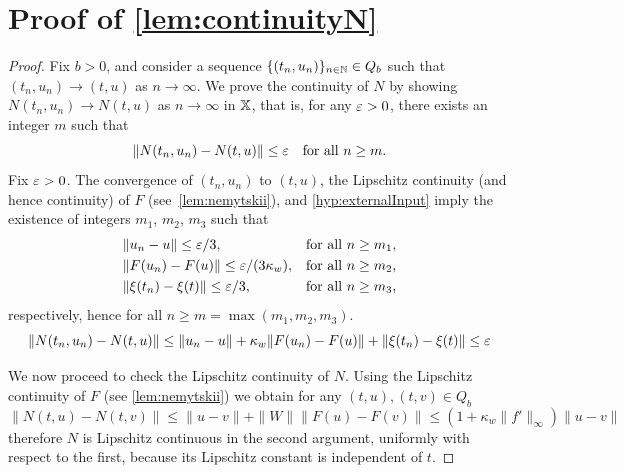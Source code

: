 \documentclass[a4paper,baskervaldx]{daarticle}
\begin{document}
\section{Proof of \texorpdfstring{\cref{lem:continuityN}}{Lemma Continuity of N}}\label{app:proof:lem:continuityN}
\begin{proof}
  Fix $b>0$, and consider a sequence $\{ (t_n,u_n)
  \}_{n \in \mathbb{N}} \in Q_b$ such that $(t_n,u_n) \to (t,u)$ as $n \to \infty$. We
  prove the continuity of $N$ by showing $N(t_n,u_n) \to N(t,u)$ as
  $n \to \infty$ in $\mathbb{X}$, that is, for any $\varepsilon >0$, there exists an
  integer $m$ such that
  \[
    \| N(t_n,u_n) - N(t,u) \| \leq \varepsilon \quad \text{for all $n \geq m$.} 
  \]
  Fix $\varepsilon >0 $. The convergence of $(t_n,u_n)$ to $(t,u)$, the Lipschitz
  continuity (and hence continuity) of $F$ (see~\cref{lem:nemytskii}), and
  \cref{hyp:externalInput} imply the existence of
  integers $m_1$, $m_2$, $m_3$ such that
  \[
    \begin{aligned}
    & \| u_n - u \| \leq \eps / 3,%
    &&\text{for all $n \geq m_1$,}\\
    & \| F(u_n) - F(u) \| \leq \eps / (3 \kappa_w), %
    &&\text{for all $n \geq m_2$,}\\
    & \| \xi(t_n) - \xi(t) \| \leq \eps / 3,%
    &&\text{for all $n \geq m_3$,}
    \end{aligned}
  \]
  respectively, hence for all $n \geq m = \max(m_1,m_2,m_3)$.
   \[
       \| N(t_n,u_n) - N(t,u) \| \leq
     \| u_n - u \|+ \kappa_w \| F(u_n) - F(u) \|+
     \| \xi(t_n) - \xi(t) \| \leq \varepsilon
   \]

  We now proceed to check the Lipschitz continuity of $N$. Using the Lipschitz
  continuity of $F$ (see \cref{lem:nemytskii}) we obtain
  for any $(t,u), (t,v) \in Q_b$ 
  \[
      \| N(t,u) - N(t,v) \| 
	\leq \| u - v \| + \| W \| \| F(u) - F(v) \| 
	\leq (1 + \kappa_w \| f' \|_\infty) \| u - v \|
  \]
  therefore $N$ is Lipschitz continuous in the second
  argument, uniformly with respect to the first, because its Lipschitz constant is
  independent of $t$.
\end{proof}
\end{document}
